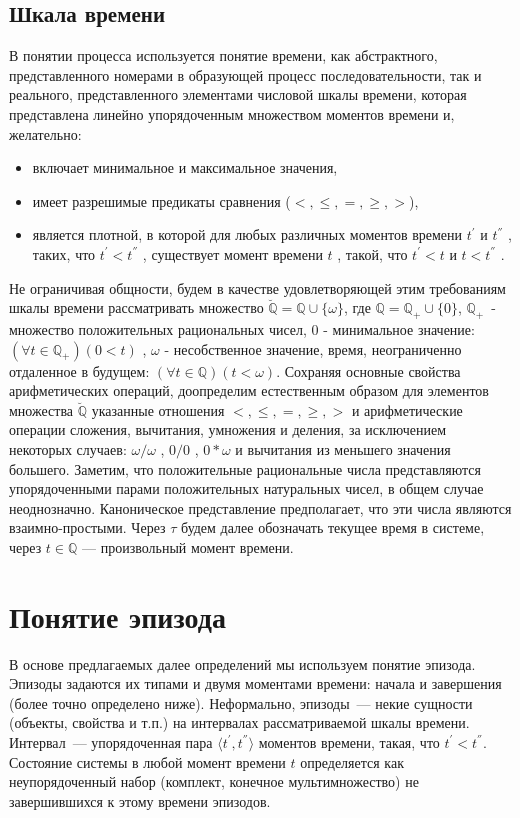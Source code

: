 \subsection{Шкала времени} \label{sec:time}
В понятии процесса используется понятие времени, как абстрактного, представленного номерами в образующей процесс последовательности, так и реального, представленного элементами числовой шкалы времени, которая представлена линейно упорядоченным множеством моментов времени и, желательно: 
\begin{itemize}
	\item включает минимальное и максимальное значения, 
	\item имеет разрешимые предикаты сравнения ($ <, \leq, =, \geq, > $),
	\item является плотной, в которой для любых различных моментов времени $ t^{'} $  и $ t^{''} $  , таких, что $ t^{'}<t^{''} $ , существует момент времени $ t $ , такой, что  $ t^{'}<t $  и $ t<t^{''} $ .
\end{itemize}

Не ограничивая общности, будем в качестве удовлетворяющей этим требованиям шкалы времени рассматривать множество $ \breve{\mathbb{Q}} = \mathbb{Q} \cup \{\omega\} $, где $ \mathbb{Q}=\mathbb{Q}_+\cup \{0\} $, $ \mathbb{Q}_+ $~- множество положительных рациональных чисел, $ 0 $ - минимальное значение:$ (\forall t \in \mathbb{Q}_+) (0<t) $ , $ \omega $ - несобственное значение, время, неограниченно отдаленное в будущем: $ (\forall t \in \mathbb{Q}) (t<\omega) $. 
Сохраняя основные свойства арифметических операций, доопределим естественным образом для элементов множества $ \breve{\mathbb{Q}} $ указанные отношения $ <, \leq, =, \geq, > $ и арифметические операции сложения, вычитания, умножения и деления, за исключением некоторых случаев: $ \omega/\omega $ , $ 0/0 $ , $ 0*\omega $  и вычитания из меньшего значения большего. 
Заметим, что положительные рациональные числа представляются упорядоченными парами положительных натуральных чисел, в общем случае неоднозначно. Каноническое представление предполагает, что эти числа являются взаимно-простыми. Через $ \tau $   будем далее обозначать текущее время в системе, через $ t\in \mathbb{Q} $  --- произвольный момент времени.

\section{Понятие эпизода}
В основе предлагаемых далее определений мы используем понятие эпизода. 
Эпизоды задаются их типами и двумя моментами времени: начала и завершения (более точно определено ниже). 
Неформально, эпизоды~--- некие сущности (объекты, свойства и т.п.) на интервалах рассматриваемой шкалы времени. 
Интервал~--- упорядоченная пара $ \langle t^{'}, t^{''}\rangle $ моментов времени, такая, что  $ t^{'}<t^{''} $. 
Состояние системы в любой момент времени $ t $ определяется как неупорядоченный набор (комплект, конечное мультимножество) не завершившихся к этому времени эпизодов.

